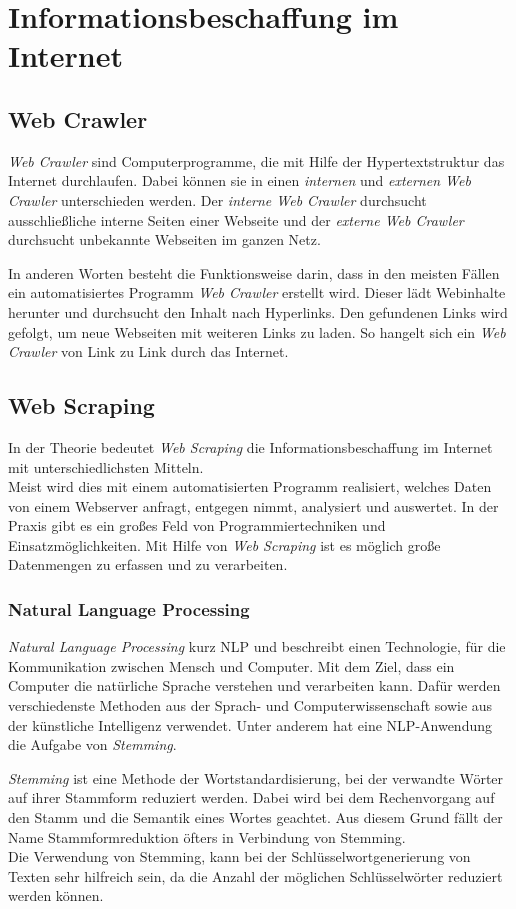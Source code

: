 \section{Informationsbeschaffung im Internet}
	\subsection{Web Crawler}
		\textit{Web Crawler} sind Computerprogramme, die mit Hilfe der Hypertextstruktur das Internet durchlaufen. Dabei können sie in einen \textit{internen} und \textit{externen Web Crawler} unterschieden werden. Der \textit{interne Web Crawler} durchsucht ausschließliche interne Seiten einer Webseite und der \textit{externe Web Crawler} durchsucht unbekannte Webseiten im ganzen Netz. \cite{sharma2012study}

		In anderen Worten besteht die Funktionsweise darin, dass in den meisten Fällen ein automatisiertes Programm \textit{Web Crawler} erstellt wird. Dieser lädt Webinhalte herunter und durchsucht den Inhalt nach Hyperlinks. Den gefundenen Links wird gefolgt, um neue Webseiten mit weiteren Links zu laden. So hangelt sich ein \textit{Web Crawler} von Link zu Link durch das Internet.\cite{WebScraping}
		
	\subsection{Web Scraping}
		In der Theorie bedeutet \textit{Web Scraping} die Informationsbeschaffung im Internet mit unterschiedlichsten Mitteln. \cite{WebScraping}\\		
		Meist wird dies mit einem automatisierten Programm realisiert, welches Daten von einem Webserver anfragt, entgegen nimmt, analysiert und auswertet. 
		In der Praxis gibt es ein großes Feld von Programmiertechniken und Einsatzmöglichkeiten.
		Mit Hilfe von \textit{Web Scraping} ist es möglich große Datenmengen zu erfassen und zu verarbeiten.\cite{WebScraping}

		\subsubsection{Natural Language Processing}
			\textit{Natural Language Processing} kurz NLP und beschreibt einen Technologie, für die Kommunikation zwischen Mensch und Computer. Mit dem Ziel, dass ein Computer die natürliche Sprache verstehen und verarbeiten kann. Dafür werden verschiedenste Methoden aus der Sprach- und Computerwissenschaft sowie aus der künstliche Intelligenz verwendet. Unter anderem hat eine NLP-Anwendung die Aufgabe von \textit{Stemming}.\cite{NLP} 
	
			\textit{Stemming} ist eine Methode der Wortstandardisierung, bei der verwandte Wörter auf ihrer Stammform reduziert werden. Dabei wird bei dem Rechenvorgang auf den Stamm und die Semantik eines Wortes geachtet. Aus diesem Grund fällt der Name Stammformreduktion öfters in Verbindung von Stemming.\cite{eldesouki2009stemming}\\
			Die Verwendung von Stemming, kann bei der Schlüsselwortgenerierung von Texten sehr hilfreich sein, da die Anzahl der möglichen Schlüsselwörter reduziert werden können.



